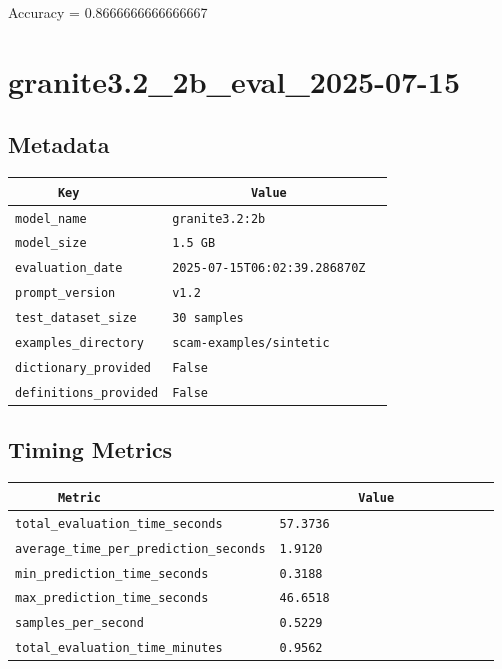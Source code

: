 \documentclass{article}
\begin{document}
\begin{center}
Accuracy = 0.8666666666666667
\end{center}

\section{granite3.2\_2b\_eval\_2025-07-15}
\subsection{Metadata}

\begin{center}
\begin{tabular}{l | l} \hline
    \verb|      Key      | & \verb|           Value           | \\ \hline
    \hline
    \verb|model_name    | & \verb|granite3.2:2b                | \\ \hline
    \verb|model_size    | & \verb|1.5 GB                       | \\ \hline
    \verb|evaluation_date| & \verb|2025-07-15T06:02:39.286870Z  | \\ \hline
    \verb|prompt_version| & \verb|v1.2                         | \\ \hline
    \verb|test_dataset_size| & \verb|30 samples                   | \\ \hline
    \verb|examples_directory| & \verb|scam-examples/sintetic       | \\ \hline
    \verb|dictionary_provided| & \verb|False                        | \\ \hline
    \verb|definitions_provided| & \verb|False                        | \\ \hline
\end{tabular}
\end{center}

\subsection{Timing Metrics}

\begin{center}
\begin{tabular}{l | l} \hline
    \verb|      Metric     | & \verb|           Value           | \\ \hline
    \hline
    \verb|total_evaluation_time_seconds| & \verb|57.3736                      | \\ \hline
    \verb|average_time_per_prediction_seconds| & \verb|1.9120                       | \\ \hline
    \verb|min_prediction_time_seconds| & \verb|0.3188                       | \\ \hline
    \verb|max_prediction_time_seconds| & \verb|46.6518                      | \\ \hline
    \verb|samples_per_second| & \verb|0.5229                       | \\ \hline
    \verb|total_evaluation_time_minutes| & \verb|0.9562                       | \\ \hline
\end{tabular}
\end{center}
\end{document}
